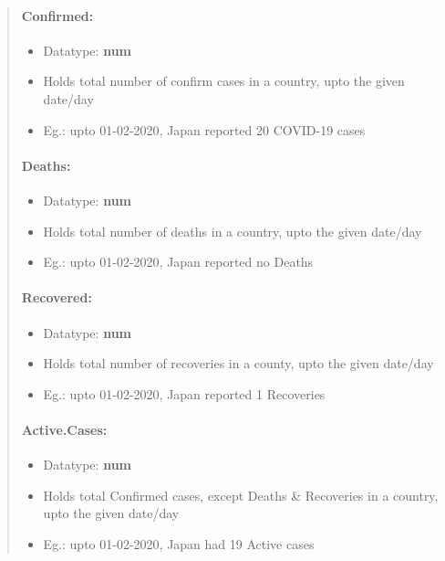 \documentclass[11pt]{article}
\providecommand{\tightlist}{%
      \setlength{\itemsep}{0pt}\setlength{\parskip}{0pt}}
\begin{document}
\begin{quote}
\mbox{}%
\hypertarget{confirmed}{%
\paragraph{Confirmed:}\label{confirmed}}

\begin{itemize}
\tightlist
\item
  Datatype: \textbf{num} 
\item
  Holds total number of confirm cases in a country, upto the given
  date/day 
\item
  Eg.: upto 01-02-2020, Japan reported 20 COVID-19 cases
\end{itemize}

\mbox{}%
\hypertarget{deaths}{%
\paragraph{Deaths:}\label{deaths}}

\begin{itemize}
\tightlist
\item
  Datatype: \textbf{num} 
\item
  Holds total number of deaths in a country, upto the given date/day 
\item
  Eg.: upto 01-02-2020, Japan reported no Deaths
\end{itemize}

\mbox{}%
\hypertarget{recovered}{%
\paragraph{Recovered:}\label{recovered}}

\begin{itemize}
\tightlist
\item
  Datatype: \textbf{num} 
\item
  Holds total number of recoveries in a county, upto the given date/day 
\item
  Eg.: upto 01-02-2020, Japan reported 1 Recoveries
\end{itemize}

\mbox{}%
\hypertarget{active.cases}{%
\paragraph{Active.Cases:}\label{active.cases}}

\begin{itemize}
\tightlist
\item
  Datatype: \textbf{num} 
\item
  Holds total Confirmed cases, except Deaths \& Recoveries in a country,
  upto the given date/day 
\item
  Eg.: upto 01-02-2020, Japan had 19 Active cases
\end{itemize}


\end{quote}
\end{document}
